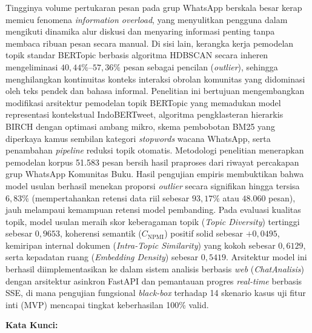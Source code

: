 

\noindent Tingginya volume pertukaran pesan pada grup WhatsApp berskala besar kerap memicu fenomena \textit{information overload}, yang menyulitkan pengguna dalam mengikuti dinamika alur diskusi dan menyaring informasi penting tanpa membaca ribuan pesan secara manual. Di sisi lain, kerangka kerja pemodelan topik standar BERTopic berbasis algoritma HDBSCAN secara inheren mengeliminasi $40{,}44\%$--$57{,}36\%$ pesan sebagai pencilan (\textit{outlier}), sehingga menghilangkan kontinuitas konteks interaksi obrolan komunitas yang didominasi oleh teks pendek dan bahasa informal. Penelitian ini bertujuan mengembangkan modifikasi arsitektur pemodelan topik BERTopic yang memadukan model representasi kontekstual IndoBERTweet, algoritma pengklasteran hierarkis BIRCH dengan optimasi ambang mikro, skema pembobotan BM25 yang diperkaya kamus sembilan kategori \textit{stopwords} wacana WhatsApp, serta penambahan \textit{pipeline} reduksi topik otomatis. Metodologi penelitian menerapkan pemodelan korpus 51.583 pesan bersih hasil praproses dari riwayat percakapan grup WhatsApp Komunitas Buku. Hasil pengujian empiris membuktikan bahwa model usulan berhasil menekan proporsi \textit{outlier} secara signifikan hingga tersisa $6{,}83\%$ (mempertahankan retensi data riil sebesar $93{,}17\%$ atau $48.060$ pesan), jauh melampaui kemampuan retensi model pembanding. Pada evaluasi kualitas topik, model usulan meraih skor keberagaman topik (\textit{Topic Diversity}) tertinggi sebesar $0{,}9653$, koherensi semantik ($C_{\text{NPMI}}$) positif solid sebesar $+0{,}0495$, kemiripan internal dokumen (\textit{Intra-Topic Similarity}) yang kokoh sebesar $0{,}6129$, serta kepadatan ruang (\textit{Embedding Density}) sebesar $0{,}5419$. Arsitektur model ini berhasil diimplementasikan ke dalam sistem analisis berbasis \textit{web} (\textit{ChatAnalisis}) dengan arsitektur asinkron FastAPI dan pemantauan progres \textit{real-time} berbasis SSE, di mana pengujian fungsional \textit{black-box} terhadap 14 skenario kasus uji fitur inti (MVP) mencapai tingkat keberhasilan 100\% valid.

\vspace{0.3cm}

\noindent \textbf{Kata Kunci:} \textit{\keywordsListId}

\newpage
